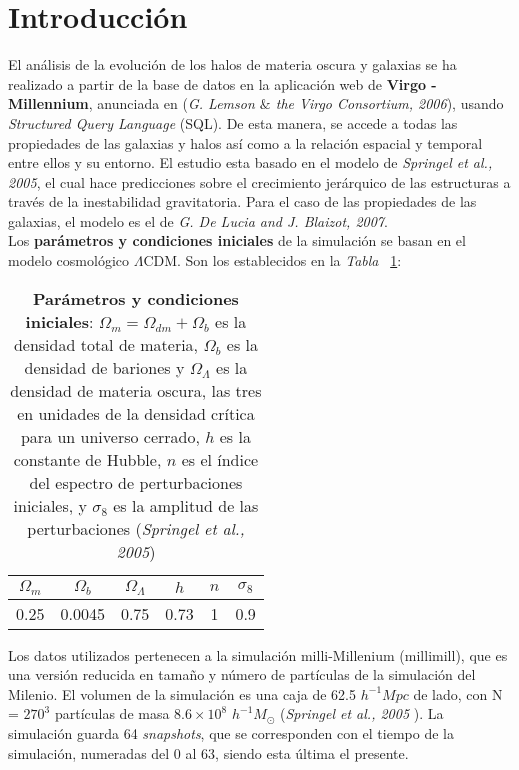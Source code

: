 \section{Introducción} 
\label{sec:1} %

El análisis de la evolución de los halos de materia oscura y galaxias se ha realizado a partir de la base de datos en la aplicación web de \textbf{Virgo - Millennium}\cite{6}, anunciada en (\textit{G. Lemson $\&$ the Virgo Consortium, 2006}\cite{5}), usando \textit{Structured Query Language} (SQL). De esta manera, se accede a todas las propiedades de las galaxias y halos así como a la relación espacial y temporal entre ellos y su entorno. El estudio esta basado en el modelo de \textit{Springel et al., 2005}\cite{1}, el cual hace predicciones sobre el crecimiento jerárquico de las estructuras a través de la inestabilidad gravitatoria. Para el caso de las propiedades de las galaxias, el modelo es el de \textit{G. De Lucia and J. Blaizot, 2007}\cite{2}.\\ 

 Los \textbf{parámetros y condiciones iniciales} de la simulación se basan en el modelo cosmológico $\Lambda$CDM. Son los establecidos en la \textit{Tabla} ~\ref{tab:tabla1}: 
 
\begin{table}[H]
\begin{center}
\begin{tabular}{c|c|c|c|c|c}
\toprule
\cellcolor[gray]{0.9}\large{$\Omega_m$} & \cellcolor[gray]{0.9}\large{$\Omega_b$} & \cellcolor[gray]{0.9}\large{$\Omega_\Lambda$} & \cellcolor[gray]{0.9}\large{$h$} & \cellcolor[gray]{0.9}\large{$n$}& \cellcolor[gray]{0.9}\large{$\sigma_8$}\\
\midrule
0.25 & 0.0045 & 0.75 & 0.73 & 1 & 0.9 \\
\bottomrule
\end{tabular}
\end{center}
\caption{\textbf{Parámetros y condiciones iniciales}: $\Omega_m = \Omega_{dm} + \Omega_b$ es la densidad total de materia, $\Omega_b$ es la densidad de bariones y $\Omega_\Lambda$ es la densidad de materia oscura, las tres en unidades de la densidad crítica para un universo cerrado, $h$ es la constante de Hubble, $n$ es el índice del espectro de perturbaciones iniciales, y $\sigma_8$ es la amplitud de las perturbaciones (\textit{Springel et al., 2005}\cite{1})}
\label{tab:tabla1}
\end{table}

Los datos utilizados pertenecen a la simulación milli-Millenium (millimill), que es una versión reducida en tamaño y número de partículas de la simulación del Milenio. El volumen de la simulación es una caja de 62.5 $h^{-1}Mpc$ de lado, con N = $270^{3}$ partículas de masa $8.6\times 10^8$ $h^{-1}M_\odot$ (\textit{Springel et al., 2005}\cite{1} \cite{7}). La simulación guarda 64 \textit{snapshots}, que se corresponden con el tiempo de la simulación, numeradas del 0 al 63, siendo esta última el presente. \\

